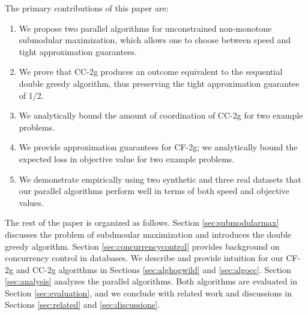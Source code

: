\documentclass{article} %
\newcommand{\hogwild}{CF-2g}
\newcommand{\occ}{CC-2g}
\begin{document}
The primary contributions of this paper are:
\begin{enumerate}
\item We propose two parallel algorithms for unconstrained non-monotone submodular maximization, which allows one to choose between speed and tight approximation guarantees.
\item We prove that \occ{} produces an outcome equivalent to the sequential double greedy algorithm, thus preserving the tight approximation guarantee of 1/2.
\item We analytically bound the amount of coordination of \occ{} for two example problems.
\item We provide approximation guarantees for \hogwild{}; we analytically bound the expected loss in objective value for two example problems.
\item We demonstrate empirically using two synthetic and three real datasets that our parallel algorithms perform well in terms of both speed and objective values.
\end{enumerate}

The rest of the paper is organized as follows.
Section \ref{sec:submodularmax} discusses the problem of subdmoular maximization and introduces the double greedy algorithm.
Section \ref{sec:concurrencycontrol} provides background on concurrency control in databases.
We describe and provide intuition for our \hogwild{} and \occ{} algorithms in Sections \ref{sec:alghogwild} and \ref{sec:algocc}.
Section \ref{sec:analysis} analyzes the parallel algorithms.
Both algorithms are evaluated in Section \ref{sec:evaluation}, and we conclude with related work and discussions in Sections \ref{sec:related} and \ref{sec:discussions}.
\end{document}
